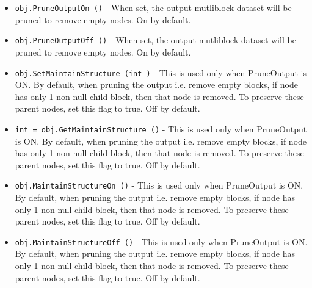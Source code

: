 \begin{itemize}
\item  \verb|obj.PruneOutputOn ()| -  When set, the output mutliblock dataset will be pruned to remove empty
 nodes. On by default.

\item  \verb|obj.PruneOutputOff ()| -  When set, the output mutliblock dataset will be pruned to remove empty
 nodes. On by default.

\item  \verb|obj.SetMaintainStructure (int )| -  This is used only when PruneOutput is ON. By default, when pruning the
 output i.e. remove empty blocks, if node has only 1 non-null child block,
 then that node is removed. To preserve these parent nodes, set this flag to
 true. Off by default.

\item  \verb|int = obj.GetMaintainStructure ()| -  This is used only when PruneOutput is ON. By default, when pruning the
 output i.e. remove empty blocks, if node has only 1 non-null child block,
 then that node is removed. To preserve these parent nodes, set this flag to
 true. Off by default.

\item  \verb|obj.MaintainStructureOn ()| -  This is used only when PruneOutput is ON. By default, when pruning the
 output i.e. remove empty blocks, if node has only 1 non-null child block,
 then that node is removed. To preserve these parent nodes, set this flag to
 true. Off by default.

\item  \verb|obj.MaintainStructureOff ()| -  This is used only when PruneOutput is ON. By default, when pruning the
 output i.e. remove empty blocks, if node has only 1 non-null child block,
 then that node is removed. To preserve these parent nodes, set this flag to
 true. Off by default.

\end{itemize}
